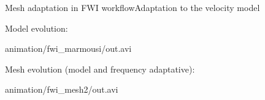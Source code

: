 \begin{frame}[noframenumbering]{Mesh adaptation in FWI workflow}{Adaptation to the velocity model}
  \begin{block}{Model evolution:}
    \begin{center}
            {animation/fwi_marmousi/out.avi}
    \end{center}
  \end{block}

  \begin{block}{Mesh evolution (model and frequency adaptative):}
    \begin{center}
            {animation/fwi_mesh2/out.avi}
    \end{center}
  \end{block}
\end{frame}










